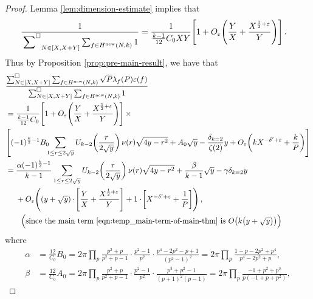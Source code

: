 \documentclass[12pt,letterpaper,reqno]{amsart}
\theoremstyle{plain}
\theoremstyle{definition}
\numberwithin{equation}{section}
\numberwithin{figure}{section}
\numberwithin{table}{section}
\newcommand{\lrp}[1]{\!\left(#1\right)}
\newcommand{\lrb}[1]{\!\left[#1\right]}
\newcommand{\new}{{\rm new}}
\begin{document}
\begin{proof}
    Lemma \ref{lem:dimension-estimate} implies that
    \begin{align}
        \frac{1}{
            \sideset{}{^\square} \sum_{\substack{N \in [X, X+Y]}} \sum_{f \in H^\new(N,k)} 1
        }
        &= \frac{1}{
            \frac{k-1}{12} C_0 XY 
        }
        \lrb{
            1 + O_\varepsilon\lrp{\frac{Y}{X} + \frac{X^{\frac{1}{2}+\varepsilon}}{Y}}
        }.
    \end{align}
    \noindent
    Thus by Proposition \ref{prop:pre-main-result}, we have that 
    \begin{align}
    &\frac{
    \sum_{N\in[X,X+Y]}^\square \sum_{f\in H^{\rm new}(N,k)}\sqrt{P}\lambda_f(P)\varepsilon(f)
    }{
    \sum_{N\in[X,X+Y]}^\square \sum_{f\in H^{\rm new}(N,k)}1 
    }  \\
    &= \frac{1}{
            \frac{k-1}{12} C_0  
        }
        \lrb{
            1 + O_\varepsilon\lrp{\frac{Y}{X} + \frac{X^{\frac{1}{2}+\varepsilon}}{Y}}
        } \times
    \\
    &
    \lrb{
        (-1)^{\frac{k}{2}-1} B_0\!\!\!\sum_{1 \le r \le 2\sqrt{y}}   U_{k-2}\lrp{\frac{r}{2\sqrt{y}}}\nu(r)\sqrt{4y-r^2} 
        + A_0\sqrt{y} - \frac{\delta_{k=2}}{\zeta(2)} y  + O_\varepsilon\lrp{kX^{-\delta'+\varepsilon}+\frac{k}{P}}
    } \\
    &= \frac{\alpha(-1)^{\frac{k}{2}-1}}{k-1}\sum_{1\leq r\leq 2\sqrt{y}}U_{k-2}\lrp{\frac{r}{2\sqrt{y}}}\nu(r)\sqrt{4y-r^2} +\frac{\beta}{k-1}\sqrt{y}-\gamma \delta_{k=2}y \\
    &\quad \ + O_\varepsilon\lrp{
        (y+\sqrt y) \cdot
        \lrb{
            \frac{Y}{X} + \frac{X^{\frac{1}{2}+\varepsilon}}{Y} 
        }
        +
        1 \cdot 
        \lrb{
            X^{-\delta'+\varepsilon} + \frac{1}{P}
        }
    }, \label{eqn:temp-main-thm-error-term}
    \\
    &\qquad \text{\Big(since the main term \eqref{eqn:temp_main-term-of-main-thm} is $O\lrp{k\big(y+\sqrt y\big)}$\Big)}
\end{align}
where
\begin{align}
    \alpha &= \frac{12}{C_0} B_0 = 2\pi 
    \prod_p 
    \frac{p^2+p}{p^2+p-1} \cdot \frac{p^2-1}{p^2} \cdot \frac{p^4 - 2p^2 - p + 1}{(p^2-1)^2}
    = 2\pi \prod_{p}\frac{1-p-2p^2+p^4}{p^4-2p^2+p},
    \\
    \beta  &= \frac{12}{C_0} A_0
    = 2\pi 
    \prod_p 
    \frac{p^2+p}{p^2+p-1} \cdot \frac{p^2-1}{p^2}
    \cdot \frac{p^3+p^2-1}{(p+1)^2(p-1)}
    = 2\pi\prod_{p}\frac{-1+p^2+p^3}{p(-1+p+p^2)},

\end{align}
\end{proof}
\end{document}
